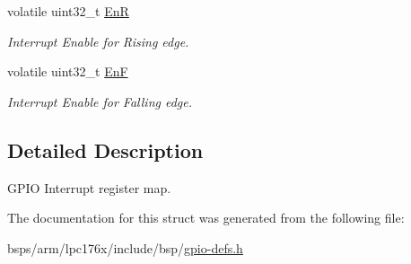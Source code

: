 \begin{DoxyCompactItemize}
volatile uint32\+\_\+t \mbox{\hyperlink{structlpc176x__interrupt__control_a5c918bbf43bc302c0c49b32302491259}{EnR}}
\begin{DoxyCompactList}\small\item\em Interrupt Enable for Rising edge. \end{DoxyCompactList}\item 
\mbox{\label{structlpc176x__interrupt__control_a36cb94c50741b46a5dd8078ed164abac}} 
volatile uint32\+\_\+t \mbox{\hyperlink{structlpc176x__interrupt__control_a36cb94c50741b46a5dd8078ed164abac}{EnF}}
\begin{DoxyCompactList}\small\item\em Interrupt Enable for Falling edge. \end{DoxyCompactList}\end{DoxyCompactItemize}


\subsection{Detailed Description}
G\+P\+IO Interrupt register map. 

The documentation for this struct was generated from the following file\+:\begin{DoxyCompactItemize}
\item 
bsps/arm/lpc176x/include/bsp/\mbox{\hyperlink{gpio-defs_8h}{gpio-\/defs.\+h}}\end{DoxyCompactItemize}
